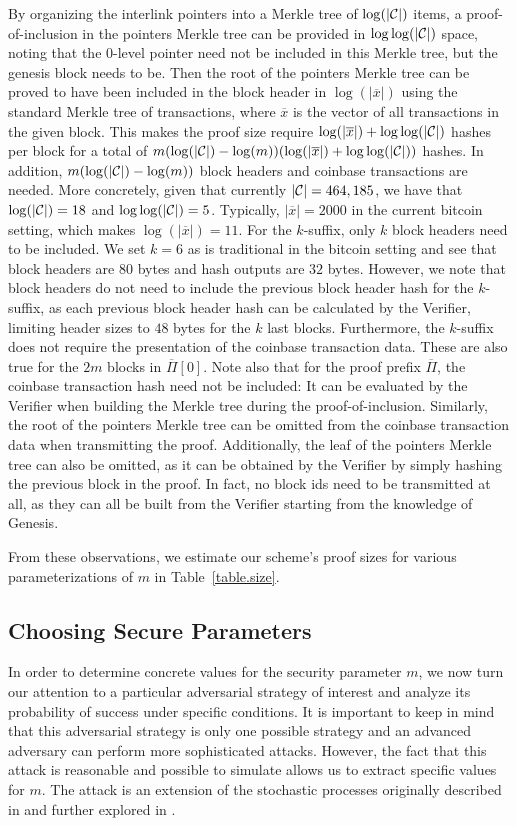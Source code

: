 By organizing the interlink pointers into a Merkle tree of $\log(|\mathcal{C}|)$
items, a proof-of-inclusion in the pointers Merkle tree can be provided in
$\log \log(|\mathcal{C}|)$ space, noting that the $0$-level pointer need not be
included in this Merkle tree, but the genesis block needs to be. Then the root
of the pointers Merkle tree can be proved to have been included in the block
header in $\log(|\overline x|)$ using the standard Merkle tree of transactions,
where $\overline x$ is the vector of all transactions in the given block. This
makes the proof size require $\log(|\overline x|) + \log\log(|\mathcal{C}|)$ hashes per
block for a total of $m (\log(|\mathcal{C}|) - \log(m))(\log(|\overline x|) +
\log\log(|\mathcal{C}|))$ hashes. In addition, $m (\log(|\mathcal{C}|) - \log(m))$ block headers
and coinbase transactions are needed. More concretely, given that currently
$|\mathcal{C}| = 464,185$, we have that $\log(|\mathcal{C}|) = 18$ and $\log\log(|\mathcal{C}|) =
5$.  Typically, $|\overline x| = 2000$ in the current bitcoin setting, which
makes $\log(|\overline x|) = 11$. For the $k$-suffix, only $k$ block headers need
to be included. We set $k = 6$ as is traditional in the bitcoin setting and see
that block headers are $80$ bytes and hash outputs are $32$ bytes. However, we
note that block headers do not need to include the previous block header hash
for the $k$-suffix, as each previous block header hash can be calculated by the
Verifier, limiting header sizes to $48$ bytes for the $k$ last blocks.
Furthermore, the $k$-suffix does not require the presentation of the coinbase
transaction data. These are also true for the $2m$ blocks in $\overline \Pi[0]$.
Note also that for the proof prefix $\overline \Pi$, the coinbase transaction
hash need not be included: It can be evaluated by the Verifier when building
the Merkle tree during the proof-of-inclusion. Similarly, the root of the
pointers Merkle tree can be omitted from the coinbase transaction data when
transmitting the proof. Additionally, the leaf of the pointers Merkle tree can
also be omitted, as it can be obtained by the Verifier by simply hashing the
previous block in the proof. In fact, no block ids need to be transmitted at
all, as they can all be built from the Verifier starting from the knowledge of
Genesis.

From these observations, we estimate our scheme's proof sizes  for various parameterizations of $m$ in Table~\ref{table.size}.


\subsection{Choosing Secure Parameters}
In order to determine concrete values for the security parameter $m$, we now
turn our attention to a particular adversarial strategy of interest and analyze
its probability of success under specific conditions. It is important to keep
in mind that this adversarial strategy is only one possible strategy and an
advanced adversary can perform more sophisticated attacks. However, the fact
that this attack is reasonable and possible to simulate allows us to extract
specific values for $m$.
The attack is an extension of the stochastic processes originally described in
\cite{bitcoin} and further explored in \cite{rosenfeld}.

